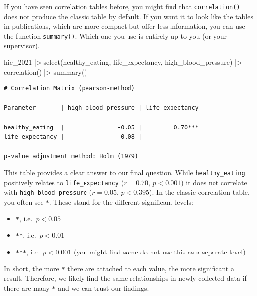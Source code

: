 \documentclass[
  letterpaper,
]{krantz}
\makeatletter
\newenvironment{Shaded}{\begin{snugshade}}{\end{snugshade}}
\newcommand{\FunctionTok}[1]{\textcolor[rgb]{0.28,0.35,0.67}{#1}}
\newcommand{\NormalTok}[1]{\textcolor[rgb]{0.00,0.23,0.31}{#1}}
\newcommand{\SpecialCharTok}[1]{\textcolor[rgb]{0.37,0.37,0.37}{#1}}
\newenvironment{kframe}{%
\medskip{}
\setlength{\fboxsep}{.8em}
 \def\at@end@of@kframe{}%
 \ifinner\ifhmode%
  \def\at@end@of@kframe{\end{minipage}}%
  \begin{minipage}{\columnwidth}%
 \fi\fi%
 \def\FrameCommand##1{\hskip\@totalleftmargin \hskip-\fboxsep
 \colorbox{shadecolor}{##1}\hskip-\fboxsep
     \hskip-\linewidth \hskip-\@totalleftmargin \hskip\columnwidth}%
 \MakeFramed {\advance\hsize-\width
   \@totalleftmargin\z@ \linewidth\hsize
   \@setminipage}}%
 {\par\unskip\endMakeFramed%
 \at@end@of@kframe}
\renewenvironment{Shaded}{\begin{kframe}}{\end{kframe}}
\makeatother
\begin{document}
If you have seen correlation tables before, you might find that
\texttt{correlation()} does not produce the classic table by default. If
you want it to look like the tables in publications, which are more
compact but offer less information, you can use the function
\texttt{summary()}. Which one you use is entirely up to you (or your
supervisor).

\begin{Shaded}
\begin{Highlighting}[]
\NormalTok{hie\_2021 }\SpecialCharTok{|\textgreater{}}
  \FunctionTok{select}\NormalTok{(healthy\_eating, life\_expectancy, high\_blood\_pressure) }\SpecialCharTok{|\textgreater{}}
  \FunctionTok{correlation}\NormalTok{() }\SpecialCharTok{|\textgreater{}}
  \FunctionTok{summary}\NormalTok{()}
\end{Highlighting}
\end{Shaded}

\begin{verbatim}
# Correlation Matrix (pearson-method)

Parameter       | high_blood_pressure | life_expectancy
-------------------------------------------------------
healthy_eating  |               -0.05 |         0.70***
life_expectancy |               -0.08 |                

p-value adjustment method: Holm (1979)
\end{verbatim}

This table provides a clear answer to our final question. While
\texttt{healthy\_eating} positively relates to \texttt{life\_expectancy}
(\(r = 0.70\), \(p <0.001\)) it does not correlate with
\texttt{high\_blood\_pressure} (\(r = 0.05\), \(p <0.395\)). In the
classic correlation table, you often see \texttt{*}. These stand for the
different significant levels:

\begin{itemize}
\item
  \texttt{*}, i.e.~\(p < 0.05\)
\item
  \texttt{**}, i.e.~\(p < 0.01\)
\item
  \texttt{***}, i.e.~\(p < 0.001\) (you might find some do not use this
  as a separate level)
\end{itemize}

In short, the more \texttt{*} there are attached to each value, the more
significant a result. Therefore, we likely find the same relationships
in newly collected data if there are many \texttt{*} and we can trust
our findings.
\end{document}
